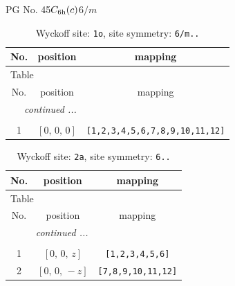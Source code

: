 \documentclass[fleqn,8pt]{jsarticle}
\begin{document}
\setcounter{MaxMatrixCols}{32}

\renewcommand{\tablename}{Table~}
\renewcommand{\figurename}{Figure~}
\begin{center}
\LARGE
PG No. 45\quad$C_{\rm 6h}(c)$\quad$6/m$\quad[ hexagonal ]
\end{center}
\renewcommand{\arraystretch}{1.2}
\begin{longtable}{ccc}
\caption{Wyckoff site: {\tt 1o}, site symmetry: {\tt 6/m..}}
 \\
 \hline \hline
No. & position & mapping \\ \hline \endfirsthead

\multicolumn{2}{l}{\tablename\ \thetable{}} \\
 \hline \hline
No. & position & mapping \\ \hline \endhead

 \hline \hline
\multicolumn{2}{r}{\footnotesize\it continued ...} \\ \endfoot

 \hline \hline
\multicolumn{2}{r}{} \\ \endlastfoot

1 & $\left[ 0,\, 0,\, 0 \right]$ & {\tt [1,2,3,4,5,6,7,8,9,10,11,12]} \\
\end{longtable}
\renewcommand{\arraystretch}{1.2}
\begin{longtable}{ccc}
\caption{Wyckoff site: {\tt 2a}, site symmetry: {\tt 6..}}
 \\
 \hline \hline
No. & position & mapping \\ \hline \endfirsthead

\multicolumn{2}{l}{\tablename\ \thetable{}} \\
 \hline \hline
No. & position & mapping \\ \hline \endhead

 \hline \hline
\multicolumn{2}{r}{\footnotesize\it continued ...} \\ \endfoot

 \hline \hline
\multicolumn{2}{r}{} \\ \endlastfoot

1 & $\left[ 0,\, 0,\, z \right]$ & {\tt [1,2,3,4,5,6]} \\ \hline
2 & $\left[ 0,\, 0,\, - z \right]$ & {\tt [7,8,9,10,11,12]} \\
\end{longtable}
\renewcommand{\arraystretch}{1.2}
\end{document}
